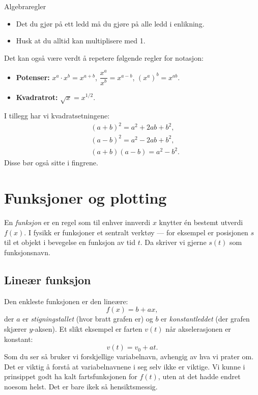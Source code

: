 \begin{myoppsum*}{Algebraregler}
    \begin{itemize}
        \item Det du gjør på ett ledd må du gjøre på alle ledd i enlikning.
        \item Husk at du alltid kan multiplisere med 1.
    \end{itemize}
\end{myoppsum*}
Det kan også være verdt å repetere følgende regler for notasjon:
\begin{itemize}
    \item \textbf{Potenser:} $x^a \cdot x^b = x^{a+b}$, \quad $\dfrac{x^a}{x^b} = x^{a-b}$, \quad $(x^a)^b = x^{ab}$.
    \item \textbf{Kvadratrot:} $\sqrt{x} = x^{1/2}$.
\end{itemize}
I tillegg har vi kvadratsetningene:
\begin{align*}
    &(a+b)^2 = a^2 + 2ab + b^2, \\
    &(a-b)^2 = a^2 - 2ab + b^2, \\
    &(a+b)(a-b) = a^2 - b^2.
\end{align*}
Disse bør også sitte i fingrene.

\section{Funksjoner og plotting}

En \emph{funksjon} er en regel som til enhver innverdi $x$ knytter én bestemt utverdi $f(x)$. I fysikk er funksjoner et sentralt verktøy — for eksempel er posisjonen $s$ til et objekt i bevegelse en funksjon av tid $t$. Da skriver vi gjerne $s(t)$ som funksjonsnavn. 

\subsection*{Lineær funksjon}
Den enkleste funksjonen er den lineære:
\[
f(x) = b+ ax,
\]
der $a$ er \emph{stigningstallet} (hvor bratt grafen er) og $b$ er \emph{konstantleddet} (der grafen skjærer $y$-aksen). Et slikt eksempel er farten $v(t)$ når akselerasjonen er konstant: \[v(t) = v_0 + at.\]
Som du ser så bruker vi forskjellige variabelnavn, avhengig av hva vi prater om. Det er viktig å forstå at variabelnavnene i seg selv ikke er viktige. Vi kunne i prinsippet godt ha kalt fartsfunksjonen for $f(t)$, uten at det hadde endret noesom helst. Det er bare ikek så hensiktsmessig. 

